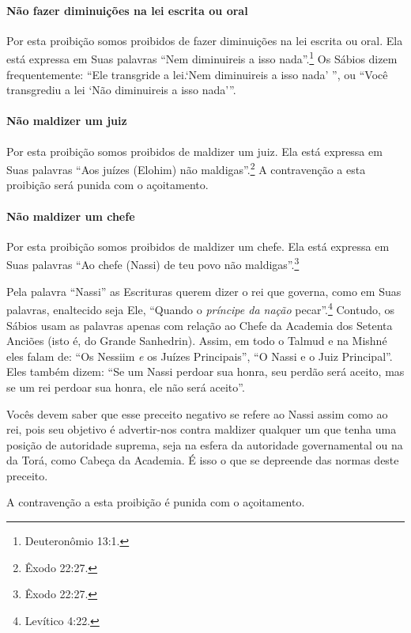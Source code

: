 \paragraph{Não fazer diminuições na lei escrita ou oral}

Por esta proibição somos proibidos de fazer diminuições na lei escrita
ou oral. Ela está expressa em Suas palavras ``Nem diminuireis a isso
nada''.\footnote{Deuteronômio 13:1.} Os Sábios dizem frequentemente: ``Ele
transgride a lei.`Nem diminuireis a isso nada' '', ou ``Você transgrediu
a lei `Não diminuireis a isso nada'''.

\paragraph{Não maldizer um juiz}

Por esta proibição somos proibidos de maldizer um juiz. Ela está
expressa em Suas palavras ``Aos juízes (Elohim) não maldigas''.\footnote{Êxodo
22:27.} A contravenção a esta proibição será punida com o açoitamento.

\paragraph{Não maldizer um chefe}

Por esta proibição somos proibidos de maldizer um chefe. Ela está
expressa em Suas palavras ``Ao chefe (Nassi) de teu povo não maldigas''.\footnote{Êxodo 22:27.}

Pela palavra ``Nassi'' as Escrituras querem dizer o
rei que governa, como em Suas palavras, enaltecido seja Ele, ``Quando o
\emph{príncipe da nação} pecar''.\footnote{Levítico 4:22.} Contudo, os Sábios
usam as palavras apenas com relação ao Chefe da Academia dos Setenta
Anciões (isto é, do Grande Sanhedrin). Assim, em todo o Talmud e na
Mishné eles falam de: ``Os Nessiim \emph{e} os Juízes Principais'', ``O
Nassi e o Juiz Principal''. Eles também dizem: ``Se um Nassi perdoar
sua honra, seu perdão será aceito, mas se um rei perdoar sua honra, ele
não será aceito''.

Vocês devem saber que esse preceito negativo se refere ao Nassi assim
como ao rei, pois seu objetivo é advertir-nos contra maldizer qualquer
um que tenha uma posição de autoridade suprema, seja na esfera da
autoridade governamental ou na da Torá, como Cabeça da Academia. É
isso o que se depreende das normas deste preceito.

A contravenção a esta proibição é punida com o açoitamento.

